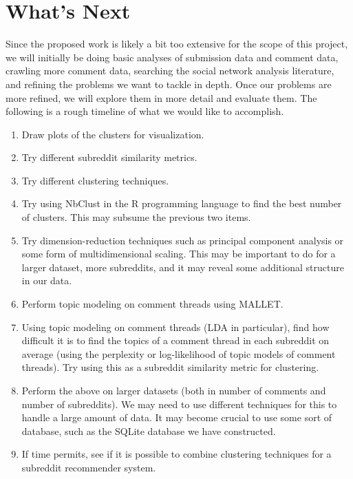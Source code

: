 \documentclass[letterpaper]{article}
\numberwithin{equation}{subsection}
\begin{document}
\section{What's Next}
Since the proposed work is likely a bit too extensive for the scope of this project, we will initially be doing basic analyses of submission data and comment data, crawling more comment data, searching the social network analysis literature, and refining the problems we want to tackle in depth. Once our problems are more refined, we will explore them in more detail and evaluate them. The following is a rough timeline of what we would like to accomplish.
    \begin{enumerate}
            \item Draw plots of the clusters for visualization.
            \item Try different subreddit similarity metrics.
            \item Try different clustering techniques.
            \item Try using NbClust in the R programming language to find the best number of clusters. This may subsume the previous two items.
            \item Try dimension-reduction techniques such as principal component analysis or some form of multidimensional scaling. This may be important to do for a larger dataset, more subreddits, and it may reveal some additional structure in our data.
            \item Perform topic modeling on comment threads using MALLET.
            \item Using topic modeling on comment threads (LDA in particular), find how difficult it is to find the topics of a comment thread in each subreddit on average (using the perplexity or log-likelihood of topic models of comment threads). Try using this as a subreddit similarity metric for clustering.
            \item Perform the above on larger datasets (both in number of comments and number of subreddits). We may need to use different techniques for this to handle a large amount of data. It may become crucial to use some sort of database, such as the SQLite database we have constructed.
            \item If time permits, see if it is possible to combine clustering techniques for a subreddit recommender system.
    \end{enumerate}


\nocite{*}

\end{document}
